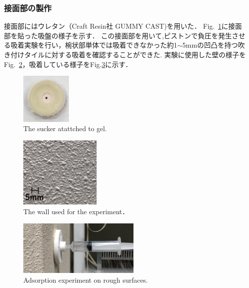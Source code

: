 \documentclass[uplatex,dvipdfmx]{jlreq}
\begin{document}
\subsubsection{接面部の製作}
接面部にはウレタン（Craft Resin社 GUMMY CAST)を用いた．
Fig.~\ref{fig:gelatattchedsucker}に接面部を貼った吸盤の様子を示す．
この接面部を用いて,ピストンで負圧を発生させる吸着実験を行い，椀状部単体では吸着できなかった約1$\sim$5mmの凹凸を持つ吹き付けタイルに対する吸着を確認することができた.
実験に使用した壁の様子をFig.~\ref{fig:The wall used for the experiment}，吸着している様子をFig.\ref{fig:Adsorption experiments on rough surfaces}に示す．

\begin{figure}[b!!!!!!]
    \centering
    \includegraphics[width=25mm]{./figure/gelsucker.jpg}
    \caption{The sucker atattched to gel.}
    \label{fig:gelatattchedsucker}
\end{figure}

\begin{figure}[t]
    \centering
    \includegraphics[width=40mm]{./figure/wall}
    \caption{The wall used for the experiment．}
    \label{fig:The wall used for the experiment}
\end{figure}

\begin{figure}[t]
    \centering
    \includegraphics[width=60mm]{./figure/gelsuckerex.PNG}
    \caption{Adsorption experiment on rough surfaces.}
    \label{fig:Adsorption experiments on rough surfaces}
\end{figure}
\end{document}
